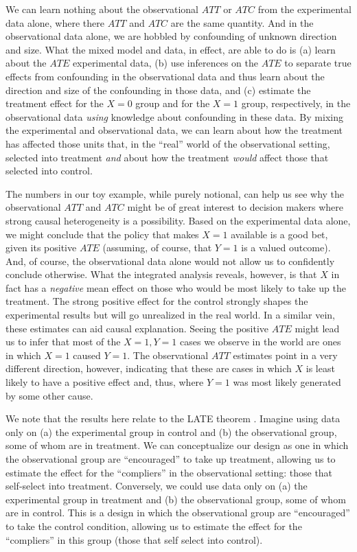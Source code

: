 \documentclass[
  12pt,
]{book}
\begin{document}
We can learn nothing about the observational \(ATT\) or \(ATC\) from the experimental data alone, where there \(ATT\) and \(ATC\) are the same quantity. And in the observational data alone, we are hobbled by confounding of unknown direction and size. What the mixed model and data, in effect, are able to do is (a) learn about the \(ATE\) experimental data, (b) use inferences on the \(ATE\) to separate true effects from confounding in the observational data and thus learn about the direction and size of the confounding in those data, and (c) estimate the treatment effect for the \(X=0\) group and for the \(X=1\) group, respectively, in the observational data \emph{using} knowledge about confounding in these data. By mixing the experimental and observational data, we can learn about how the treatment has affected those units that, in the ``real'' world of the observational setting, selected into treatment \emph{and} about how the treatment \emph{would} affect those that selected into control.

The numbers in our toy example, while purely notional, can help us see why the observational \(ATT\) and \(ATC\) might be of great interest to decision makers where strong causal heterogeneity is a possibility. Based on the experimental data alone, we might conclude that the policy that makes \(X=1\) available is a good bet, given its positive \(ATE\) (assuming, of course, that \(Y=1\) is a valued outcome). And, of course, the observational data alone would not allow us to confidently conclude otherwise. What the integrated analysis reveals, however, is that \(X\) in fact has a \emph{negative} mean effect on those who would be most likely to take up the treatment. The strong positive effect for the control strongly shapes the experimental results but will go unrealized in the real world.
In a similar vein, these estimates can aid causal explanation. Seeing the positive \(ATE\) might lead us to infer that most of the \(X=1, Y=1\) cases we observe in the world are ones in which \(X=1\) caused \(Y=1\). The observational \(ATT\) estimates point in a very different direction, however, indicating that these are cases in which \(X\) is least likely to have a positive effect and, thus, where \(Y=1\) was most likely generated by some other cause.

We note that the results here relate to the LATE theorem \citep{angrist1995identification}. Imagine using data only on (a) the experimental group in control and (b) the observational group, some of whom are in treatment. We can conceptualize our design as one in which the observational group are ``encouraged'' to take up treatment, allowing us to estimate the effect for the ``compliers'' in the observational setting: those that self-select into treatment. Conversely, we could use data only on (a) the experimental group in treatment and (b) the observational group, some of whom are in control. This is a design in which the observational group are ``encouraged'' to take the control condition, allowing us to estimate the effect for the ``compliers'' in this group (those that self select into control).
\end{document}
